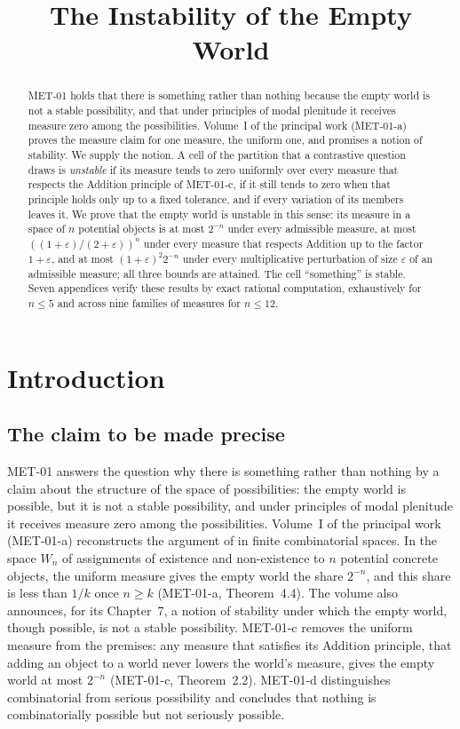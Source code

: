 \documentclass{situationist-preprint}
\title{The Instability of the Empty World}
\begin{document}
\maketitle

\begin{abstract}
MET-01 holds that there is something rather than nothing because the empty world is not a stable possibility, and that under principles of modal plenitude it receives measure zero among the possibilities. Volume~I of the principal work (MET-01-a) proves the measure claim for one measure, the uniform one, and promises a notion of stability. We supply the notion. A cell of the partition that a contrastive question draws is \emph{unstable} if its measure tends to zero uniformly over every measure that respects the Addition principle of MET-01-c, if it still tends to zero when that principle holds only up to a fixed tolerance, and if every variation of its members leaves it. We prove that the empty world is unstable in this sense: its measure in a space of $n$ potential objects is at most $2^{-n}$ under every admissible measure, at most $((1+\varepsilon)/(2+\varepsilon))^n$ under every measure that respects Addition up to the factor $1+\varepsilon$, and at most $(1+\varepsilon)^2 2^{-n}$ under every multiplicative perturbation of size $\varepsilon$ of an admissible measure; all three bounds are attained. The cell \enquote{something} is stable. Seven appendices verify these results by exact rational computation, exhaustively for $n \leq 5$ and across nine families of measures for $n \leq 12$.
\end{abstract}

\section{Introduction}

\subsection{The claim to be made precise}

MET-01 answers the question why there is something rather than nothing by a claim about the structure of the space of possibilities: the empty world is possible, but it is not a stable possibility, and under principles of modal plenitude it receives measure zero among the possibilities. Volume~I of the principal work (MET-01-a) reconstructs the argument of \citet{vanInwagen1996} in finite combinatorial spaces. In the space $W_n$ of assignments of existence and non-existence to $n$ potential concrete objects, the uniform measure gives the empty world the share $2^{-n}$, and this share is less than $1/k$ once $n \geq k$ (MET-01-a, Theorem~4.4). The volume also announces, for its Chapter~7, a notion of stability under which the empty world, though possible, is not a stable possibility. MET-01-c removes the uniform measure from the premises: any measure that satisfies its Addition principle, that adding an object to a world never lowers the world's measure, gives the empty world at most $2^{-n}$ (MET-01-c, Theorem~2.2). MET-01-d distinguishes combinatorial from serious possibility and concludes that nothing is combinatorially possible but not seriously possible.
\end{document}
